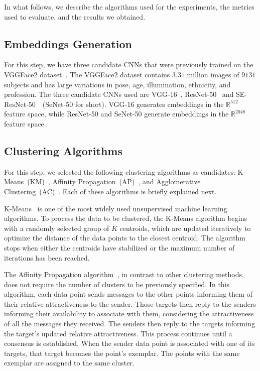 In what follows, we describe the algorithms used for the experiments, the metrics used to evaluate, and the results we obtained.

\subsection{Embeddings Generation}

For this step, we have three candidate CNNs that were previously trained on the VGGFace2 dataset~\cite{cao2018vggface2}. 
The VGGFace2 dataset contains $3.31$ million images of $9131$ subjects and has large variations in pose, age, illumination, ethnicity, and profession.
The three candidate CNNs used are VGG-16~\cite{vgg16}, ResNet-50~\cite{resnet} and SE-ResNet-50~\cite{senet}~(SeNet-50 for short). VGG-16 generates embeddings in the $\mathbb{R}^{512}$  feature space, while ResNet-50 and SeNet-50 generate embeddings in the $\mathbb{R}^{2048}$ feature space. 


\subsection{Clustering Algorithms}
For this step, we selected the following clustering algorithms as candidates: K-Means~(KM)~\cite{lloyd1982least}, Affinity Propagation~(AP)~\cite{frey2007clustering}, and Agglomerative Clustering~(AC)~\cite{ward1963hierarchical}. Each of these algorithms is briefly explained next.

K-Means~\cite{lloyd1982least} is one of the most widely used unsupervised machine learning algorithms. 
To process the data to be clustered, the K-Means algorithm begins with a randomly selected group of $K$ centroids, which are updated iteratively to optimize the distance of the data points to the closest centroid.
The algorithm stops when either the centroids have stabilized or the maximum number of iterations has been reached.

The Affinity Propagation algorithm~\cite{frey2007clustering}, in contrast to other clustering methods, does not require the number of clusters to be previously specified.
In this algorithm, each data point sends messages to the other points informing them of their relative attractiveness to the sender. 
Those targets then reply to the senders informing their availability to associate with them, considering the attractiveness of all the messages they received.
The senders then reply to the targets informing the target's updated relative attractiveness.
This process continues until a consensus is established.
When the sender data point is associated with one of its targets, that target becomes the point's exemplar.
The points with the same exemplar are assigned to the same cluster.


